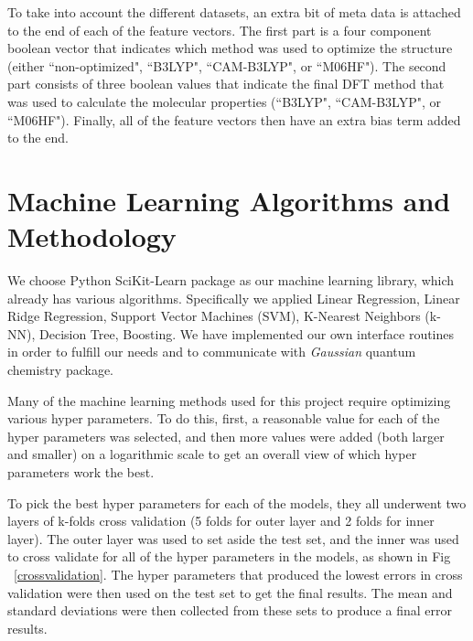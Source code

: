 \documentclass[12pt, oneside]{article}   	%
\begin{document}
To take into account the different datasets, an extra bit of meta data is attached to the end of each of the feature vectors. The first part is a four component boolean vector that indicates which method was used to optimize the structure (either ``non-optimized", ``B3LYP", ``CAM-B3LYP", or ``M06HF"). The second part consists of three boolean values that indicate the final DFT method that was used to calculate the molecular properties (``B3LYP", ``CAM-B3LYP", or ``M06HF"). Finally, all of the feature vectors then have an extra bias term added to the end.


\section{Machine Learning Algorithms and Methodology}


\noindent We choose Python SciKit-Learn package\cite{scikit-learn} as our machine learning library, which already has various algorithms. Specifically we applied Linear Regression, Linear Ridge Regression, Support Vector Machines (SVM), K-Nearest Neighbors (k-NN), Decision Tree, Boosting. We have implemented our own interface routines in order to fulfill our needs and to communicate with \textit{Gaussian} quantum chemistry package.

Many of the machine learning methods used for this project require optimizing various hyper parameters. To do this, first, a reasonable value for each of the hyper parameters was selected, and then more values were added (both larger and smaller) on a logarithmic scale to get an overall view of which hyper parameters work the best.

To pick the best hyper parameters for each of the models, they all underwent two layers of k-folds cross validation (5 folds for outer layer and 2 folds for inner layer). The outer layer was used to set aside the test set, and the inner was used to cross validate for all of the hyper parameters in the models, as shown in Fig ~\ref{crossvalidation}. The hyper parameters that produced the lowest errors in cross validation were then used on the test set to get the final results. The mean and standard deviations were then collected from these sets to produce a final error results. 
\end{document}
